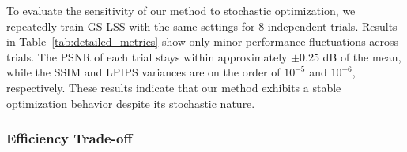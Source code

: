 \documentclass[lettersize,journal]{IEEEtran}
\begin{document}
To evaluate the sensitivity of our method to stochastic optimization, we repeatedly train GS-LSS with the same settings for 8 independent trials.
Results in Table~\ref{tab:detailed_metrics} show only minor performance fluctuations across trials. The PSNR of each trial stays within approximately $\pm 0.25$ dB of the mean, while the SSIM and LPIPS variances are on the order of $10^{-5}$ and $10^{-6}$, respectively. These results indicate that our method exhibits a stable optimization behavior despite its stochastic nature.


\subsubsection{Efficiency Trade-off}


\begin{table}[h]
\centering
\caption{Average training time and rendering quality comparison on Tanks \& Temples with a 60$^\circ$ coverage gap.}
\label{tab:training-time}
\setlength{\tabcolsep}{3pt}
\end{table}
\end{document}

